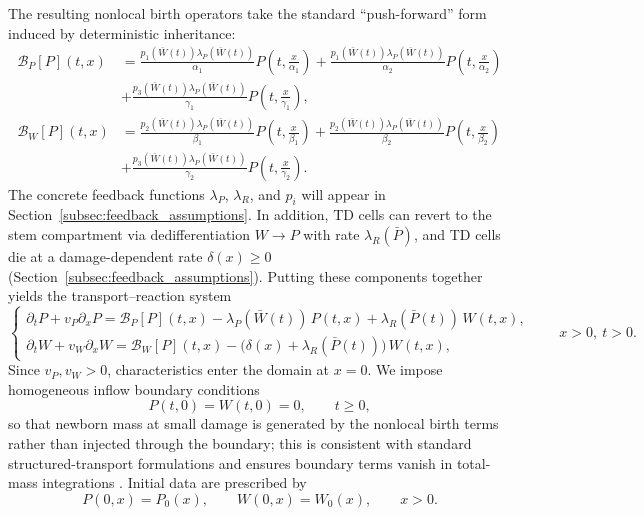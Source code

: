 \documentclass[pdflatex,sn-mathphys-ay]{sn-jnl}
\theoremstyle{thmstyleone}
\theoremstyle{definition}
\theoremstyle{remark}
\begin{document}
The resulting nonlocal birth operators take the standard ``push-forward'' form induced by deterministic inheritance:
\begin{align}
\label{eq:birth_ops}
\mathcal B_P[P](t,x) &=
\frac{p_1(\bar W(t))\lambda_P(\bar W(t))}{\alpha_1}P\!\left(t,\frac{x}{\alpha_1}\right)
+\frac{p_1(\bar W(t))\lambda_P(\bar W(t))}{\alpha_2}P\!\left(t,\frac{x}{\alpha_2}\right) \nonumber\\[6pt]
&+\frac{p_3(\bar W(t))\lambda_P(\bar W(t))}{\gamma_1}P\!\left(t,\frac{x}{\gamma_1}\right),\\[6pt]
\nonumber
\mathcal B_W[P](t,x) &=
\frac{p_2(\bar W(t))\lambda_P(\bar W(t))}{\beta_1}P\!\left(t,\frac{x}{\beta_1}\right)
+\frac{p_2(\bar W(t))\lambda_P(\bar W(t))}{\beta_2}P\!\left(t,\frac{x}{\beta_2}\right) \\[6pt]
&+\frac{p_3(\bar W(t))\lambda_P(\bar W(t))}{\gamma_2}P\!\left(t,\frac{x}{\gamma_2}\right).
\end{align}
The concrete feedback functions $\lambda_P$, $\lambda_R$, and $p_i$ will appear in Section~\ref{subsec:feedback_assumptions}.
In addition, TD cells can revert to the stem compartment via dedifferentiation $W\to P$ with rate $\lambda_R(\bar P)$, and TD cells die at a damage-dependent rate $\delta(x)\ge 0$ (Section~\ref{subsec:feedback_assumptions}). Putting these components together yields the transport--reaction system \citep{wang_damage-structured_2026}
\begin{equation}\label{eq:PDE_model}
\begin{cases}
\partial_t P + v_P \partial_x P
= \mathcal B_P[P](t,x) - \lambda_P(\bar W(t))\,P(t,x) + \lambda_R(\bar P(t))\,W(t,x),\\[4pt]
\partial_t W + v_W \partial_x W
= \mathcal B_W[P](t,x) - \big(\delta(x)+\lambda_R(\bar P(t))\big)\,W(t,x),
\end{cases} \qquad x>0,\ t>0.
\end{equation}
Since $v_P,v_W>0$, characteristics enter the domain at $x=0$. We impose homogeneous inflow boundary conditions
\begin{equation}\label{eq:inflow_bc}
P(t,0)=W(t,0)=0,\qquad t\ge 0,
\end{equation}
so that newborn mass at small damage is generated by the nonlocal birth terms rather than injected through the boundary; this is consistent with standard structured-transport formulations and ensures boundary terms vanish in total-mass integrations \citep{perthame_introduction_2023,liang_global_2025}. Initial data are prescribed by
\begin{equation}\label{eq:IC}
P(0,x)=P_0(x),\qquad W(0,x)=W_0(x),\qquad x>0.
\end{equation}
\end{document}
